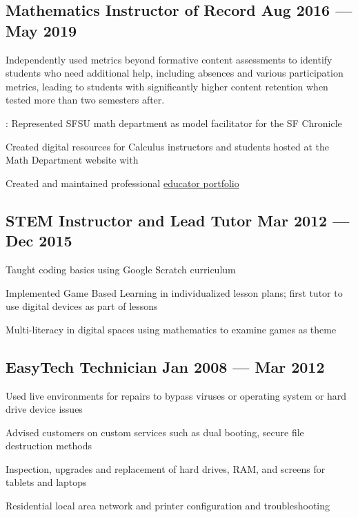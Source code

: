 \documentclass[letter,10pt]{article}
\begin{document}
\subsection{Mathematics Instructor of Record  \hfill	Aug 2016 --- May 2019}
\begin{zitemize}
\item Independently used metrics beyond formative content assessments to identify students who need additional help, including absences and various participation metrics, leading to students with significantly higher content retention when tested more than two semesters after.
\item {}: Represented SFSU math department as model facilitator for the SF Chronicle
\item Created digital resources for Calculus instructors and students hosted at the Math Department website with 
\item Created and maintained professional  \href{http://www.mathwithtimmy.com}{educator portfolio}
\end{zitemize}

\subsection{STEM Instructor and Lead Tutor \hfill	Mar 2012 --- Dec 2015}
\begin{zitemize}
\item Taught coding basics using Google Scratch curriculum
\item Implemented Game Based Learning in individualized lesson plans; first tutor to use digital devices as part of lessons
\item Multi-literacy in digital spaces using mathematics to examine games as theme
\end{zitemize}
\subsection{EasyTech Technician \hfill	Jan 2008 --- Mar 2012}
\begin{zitemize}
\item Used  live environments for repairs to bypass viruses or operating system or hard drive device issues
\item Advised customers on custom services such as dual booting, secure file destruction methods
\item Inspection, upgrades and replacement of hard drives, RAM, and screens for tablets and laptops
\item Residential local area network and printer configuration and troubleshooting
\end{zitemize}
\end{document}
